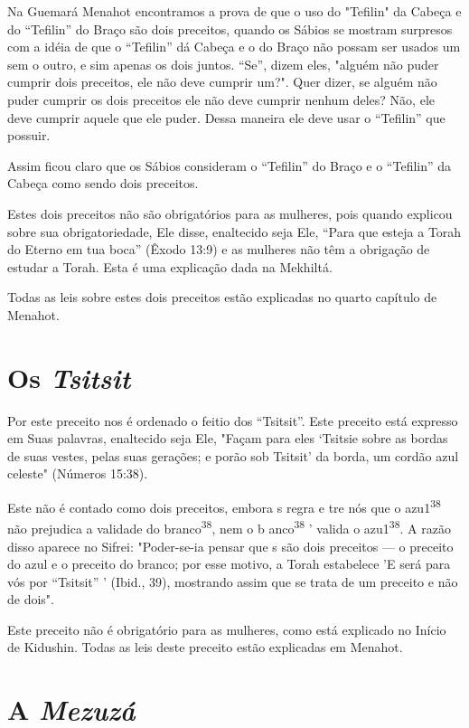Na Guemará Menahot encontramos a prova de que o uso do "Tefi­lin" da
Cabeça e do ``Tefilin'' do Braço são dois preceitos, quando os Sábios se
mostram surpresos com a idéia de que o ``Tefilin'' dá Cabeça e o do Braço
não possam ser usados um sem o outro, e sim apenas os dois juntos. ``Se'',
di­zem eles, "alguém não puder cumprir dois preceitos, ele não deve
cumprir um?". Quer dizer, se alguém não puder cumprir os dois preceitos
ele não deve cum­prir nenhum deles? Não, ele deve cumprir aquele que ele
puder. Dessa maneira ele deve usar o ``Tefilin'' que possuir.

Assim ficou claro que os Sábios consideram o ``Tefilin'' do Braço e o
``Tefilin'' da Cabeça como sendo dois preceitos.

Estes dois preceitos não são obrigatórios para as mulheres, pois quan­do
explicou sobre sua obrigatoriedade, Ele disse, enaltecido seja Ele,
``Para que esteja a Torah do Eterno em tua boca'' (Êxodo 13:9) e as
mulheres não têm a obrigação de estudar a Torah. Esta é uma explicação
dada na Mekhiltá.

Todas as leis sobre estes dois preceitos estão explicadas no quarto
capítulo de Menahot.

\section{Os \emph{Tsitsit}}

Por este preceito nos é ordenado o feitio dos ``Tsitsit''. Este precei­to
está expresso em Suas palavras, enaltecido seja Ele, "Façam para eles
`Tsitsie sobre as bordas de suas vestes, pelas suas gerações; e porão
sob Tsitsit' da borda, um cordão azul celeste" (Números 15:38).

Este não é contado como dois preceitos, embora s regra e tre nós que o
azu1\textsuperscript{38} não prejudica a validade do
branco\textsuperscript{38}, nem o b anco\textsuperscript{38} ' valida o
azu1\textsuperscript{38}. A razão disso aparece no Sifrei: "Poder-se-ia
pensar que s são dois preceitos --- o preceito do azul e o preceito do
branco; por esse motivo, a To­rah estabelece 'E será para vós por
``Tsitsit'' ' (Ibid., 39), mostrando assim que se trata de um preceito e
não de dois".

Este preceito não é obrigatório para as mulheres, como está explicado no
Início de Kidushin. Todas as leis deste preceito estão explicadas em
Menahot.

\section{A \emph{Mezuzá}}

